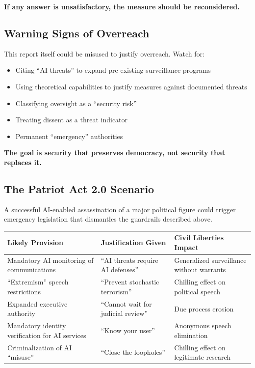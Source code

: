 \documentclass[11pt,letterpaper]{article}
\begin{document}
\textbf{If any answer is unsatisfactory, the measure should be reconsidered.}

\subsection{Warning Signs of Overreach}

This report itself could be misused to justify overreach. Watch for:

\begin{itemize}
  \item Citing ``AI threats'' to expand pre-existing surveillance programs
  \item Using theoretical capabilities to justify measures against documented threats
  \item Classifying oversight as a ``security risk''
  \item Treating dissent as a threat indicator
  \item Permanent ``emergency'' authorities
\end{itemize}

\begin{keybox}
\textbf{The goal is security that preserves democracy, not security that replaces it.}
\end{keybox}

\subsection{The Patriot Act 2.0 Scenario}

A successful AI-enabled assassination of a major political figure could trigger emergency legislation that dismantles the guardrails described above.

\begin{center}
\small
\begin{tabular}{L{4cm}L{4cm}L{5cm}}
\toprule
\textbf{Likely Provision} & \textbf{Justification Given} & \textbf{Civil Liberties Impact} \\
\midrule
Mandatory AI monitoring of communications & ``AI threats require AI defenses'' & Generalized surveillance without warrants \\
``Extremism'' speech restrictions & ``Prevent stochastic terrorism'' & Chilling effect on political speech \\
Expanded executive authority & ``Cannot wait for judicial review'' & Due process erosion \\
Mandatory identity verification for AI services & ``Know your user'' & Anonymous speech elimination \\
Criminalization of AI ``misuse'' & ``Close the loopholes'' & Chilling effect on legitimate research \\
\bottomrule
\end{tabular}
\end{center}
\end{document}
